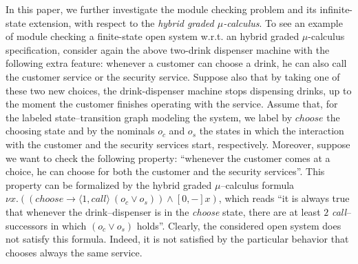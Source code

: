 \documentclass{LMCS}
\theoremstyle{plain}
\newcommand \tpl[1] {\langle #1 \rangle}
\begin{document}
In this paper, we further investigate the module checking problem and its
infinite-state extension, with respect to the \emph{hybrid graded
$\mu$-calculus}. To see an example of module checking a finite-state open
system w.r.t. an hybrid graded $\mu$-calculus specification, consider again the
above two-drink dispenser machine with the following extra feature: whenever a
customer can choose a drink, he can also call the customer service or the
security service. Suppose also that by taking one of these two new choices, the
drink-dispenser machine stops dispensing drinks, up to the moment the customer
finishes operating with the service. Assume that, for the labeled
state--transition graph modeling the system, we label by $\mathit{choose}$ the
choosing state and by the nominals $o_{c}$ and $o_{s}$ the states in which the
interaction with the customer and the security services start, respectively.
Moreover, suppose we want to check the following property: ``whenever the
customer comes at a choice, he can choose for both the customer and the
security services''. This property can be formalized by the hybrid graded
$\mu$--calculus formula $\nu x. ((choose \rightarrow \tpl{1,call} \ (o_c \vee
o_s)) \wedge [0,-]x)$, which reads ``it is always true that whenever the
drink--dispenser is in the \emph{choose} state, there are at least $2$
\emph{call}--successors in which $(o_c \vee o_s)$ holds''. Clearly, the
considered open system does not satisfy this formula. Indeed, it is not
satisfied by the particular behavior that chooses always the same service.
\end{document}
